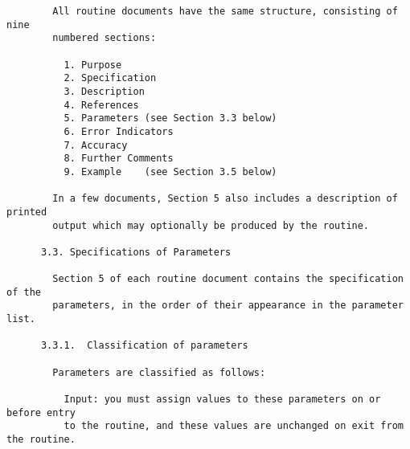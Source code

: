 \begin{small}
\begin{verbatim}
        All routine documents have the same structure, consisting of nine         
        numbered sections:                                                        
                                                                                  
          1. Purpose                                                              
          2. Specification                                                        
          3. Description                                                          
          4. References                                                           
          5. Parameters (see Section 3.3 below)                                   
          6. Error Indicators                                                     
          7. Accuracy                                                             
          8. Further Comments                                                     
          9. Example    (see Section 3.5 below)                                   
                                                                                  
        In a few documents, Section 5 also includes a description of printed      
        output which may optionally be produced by the routine.                   
                                                                                  
      3.3. Specifications of Parameters                                           
                                                                                  
        Section 5 of each routine document contains the specification of the      
        parameters, in the order of their appearance in the parameter list.       
                                                                                  
      3.3.1.  Classification of parameters                                        
                                                                                  
        Parameters are classified as follows:                                     
                                                                                  
          Input: you must assign values to these parameters on or before entry    
          to the routine, and these values are unchanged on exit from the routine.
                                                                                  

\end{verbatim}
\end{small}
